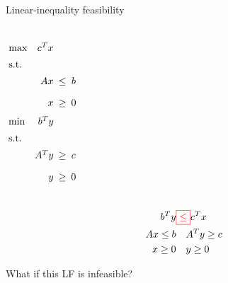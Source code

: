 \begin{frame}{Linear-inequality feasibility}
  \begin{columns}
	  \begin{equation*}
		\setlength\arraycolsep{2.5pt}
		\begin{array}{l@{\quad}rcc}
		  \max 	& c^{T}x	&	&	\\[5pt]
		  \text{s.t.} 	&	&	&	\\[5pt]
				&	Ax 	&	\leq	&	b	\\[10pt]
				&	x	& 	\geq 	&	0	
		\end{array}
	  \end{equation*}
	  \begin{equation*}
		\setlength\arraycolsep{2.5pt}
		\begin{array}{l@{\quad}rcc}
		  \min 	& b^{T}y	&	&	\\[5pt]
		  \text{s.t.} 	&	&	&	\\[5pt]
				&	A^{T}y 	&	\geq	&	c	\\[10pt]
				&	y	& 	\geq 	&	0	
		\end{array}
	  \end{equation*}
  \end{columns}

  \begin{align*}
	b^{T} y &\textcolor{red}{\boxed{\leq}} c^{T} x	\\
	Ax \leq b	&	\quad	A^{T} y \geq c	\\
	x \geq 0	&	\quad 	y \geq 0
  \end{align*}

  \begin{center}
	 What if this LF is infeasible?
  \end{center}
\end{frame}
